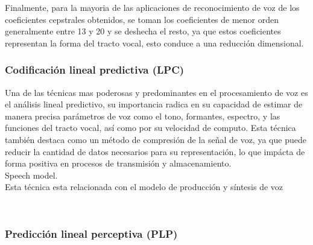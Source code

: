 Finalmente, para la mayoria de las aplicaciones de reconocimiento de voz de los coeficientes cepstrales obtenidos, se toman los coeficientes de menor orden generalmente entre 13 y 20 y se deshecha el resto, ya que estos coeficientes representan la forma del tracto vocal, esto conduce a una reducción dimensional.

\subsubsection{Codificaci\'on lineal predictiva (LPC)}

Una de las t\'ecnicas mas poderosas y predominantes en el procesamiento de voz es el an\'alisis lineal predictivo, su importancia radica en su capacidad de estimar de manera precisa par\'ametros de voz como el tono, formantes, espectro, y las funciones del tracto vocal, as\'i como por su velocidad de computo. Esta t\'ecnica tambi\'en destaca como un m\'etodo de compresi\'on de la señal de voz, ya que puede reducir la cantidad de datos necesarios para su representaci\'on, lo que imp\'acta de forma positiva en procesos de transmisi\'on y almacenamiento. \\

Speech model.\\
Esta t\'ecnica esta relacionada con el modelo de producci\'on y s\'intesis de voz

\cite{ney}
\cite{gold}
\cite{campbell1997}
\cite{rabiner1987}
\cite{beigi2011}\\


\subsubsection{Predicci\'on lineal perceptiva (PLP)}



